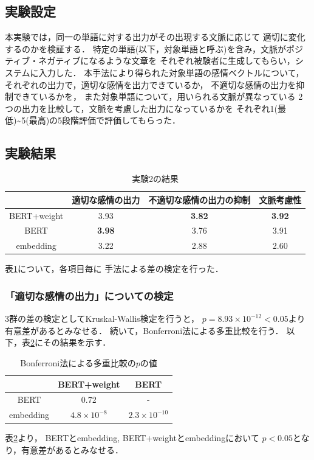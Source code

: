 	\subsection{実験設定}
		本実験では，同一の単語に対する出力がその出現する文脈に応じて
		適切に変化するのかを検証する．
		特定の単語(以下，対象単語と呼ぶ)を含み，文脈がポジティブ・ネガティブになるような文章を
		それぞれ被験者に生成してもらい，システムに入力した．
		本手法により得られた対象単語の感情ベクトルについて，
		それぞれの出力で，適切な感情を出力できているか，
		不適切な感情の出力を抑制できているかを，
		また対象単語について，用いられる文脈が異なっている
		2つの出力を比較して，文脈を考慮した出力になっているかを
		それぞれ1(最低)\textasciitilde5(最高)の5段階評価で評価してもらった．


	\subsection{実験結果}
	\begin{table}[H]
		\centering
		\caption{実験2の結果}
		\label{table:normal_word_result}
			\begin{tabular}{cccc}
				\hline
				& 適切な感情の出力 & 不適切な感情の出力の抑制 & 文脈考慮性 \\
				\hline \hline
				BERT+weight & 3.93 & \textbf{3.82} & \textbf{3.92} \\
				BERT & \textbf{3.98} & 3.76 & 3.91 \\
				embedding & 3.22 & 2.88 & 2.60 \\
				\hline
			\end{tabular}
	\end{table}

	表\ref{table:normal_word_result}について，各項目毎に
	手法による差の検定を行った．
	\subsubsection{「適切な感情の出力」についての検定}
		3群の差の検定としてKruskal-Wallis検定を行うと，
		$p=8.93\times10^{-12}<0.05$より有意差があるとみなせる．
		続いて，Bonferroni法による多重比較を行う．
		以下，表\ref{table:jikken2_good_Bonferroni}にその結果を示す．
		\begin{table}[H]
			\centering
			\caption{Bonferroni法による多重比較の$p$の値}
			\label{table:jikken2_good_Bonferroni}
			\begin{tabular}{|c|c|c|}
				\hline
				& BERT+weight & BERT \\
				\hline
				BERT & 0.72 & - \\
				\hline
				embedding & $4.8\times10^{-8}$ & $2.3\times10^{-10}$ \\
				\hline
			\end{tabular}
		\end{table}
		表\ref{table:jikken2_good_Bonferroni}より，
		BERTとembedding, BERT+weightとembeddingにおいて
		$p<0.05$となり，有意差があるとみなせる．
